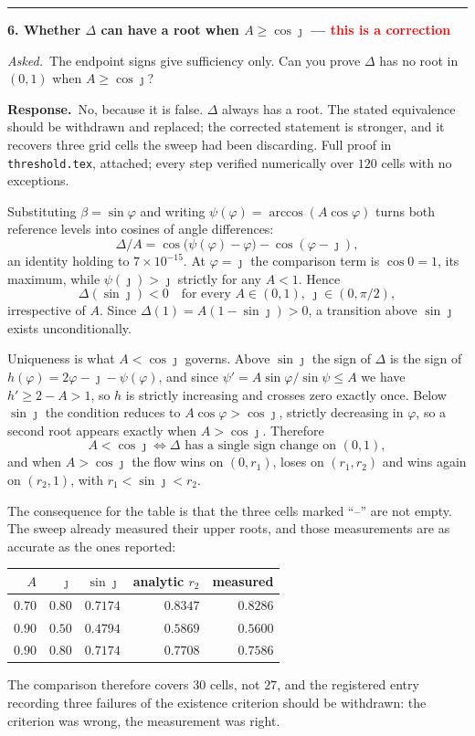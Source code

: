 \documentclass[11pt]{article}
\newenvironment{item12}[1]{%
  \par\medskip\noindent\rule{\textwidth}{0.7pt}\par\nobreak\smallskip
  \noindent\textbf{\large #1}\par\nobreak\smallskip
}{\par\medskip}
\newcommand{\ask}[1]{\noindent\emph{Asked.}\ #1\par\smallskip}
\newcommand{\resp}{\noindent\textbf{Response.}\ }
\begin{document}
\begin{item12}{6. Whether $\Delta$ can have a root when $A\ge\cos\jmath$
\;---\; \textcolor{red}{this is a correction}}
\ask{The endpoint signs give sufficiency only. Can you prove $\Delta$ has no root in $(0,1)$ when
$A\ge\cos\jmath$?}

\resp No, because it is false. $\Delta$ always has a root. The stated equivalence should be
withdrawn and replaced; the corrected statement is stronger, and it recovers three grid cells the
sweep had been discarding. Full proof in \texttt{threshold.tex}, attached; every step verified
numerically over $120$ cells with no exceptions.

Substituting $\beta=\sin\varphi$ and writing $\psi(\varphi)=\arccos(A\cos\varphi)$ turns both
reference levels into cosines of angle differences:
\[
\Delta/A=\cos\!\big(\psi(\varphi)-\varphi\big)-\cos(\varphi-\jmath),
\]
an identity holding to $7\times10^{-15}$. At $\varphi=\jmath$ the comparison term is $\cos 0=1$,
its maximum, while $\psi(\jmath)>\jmath$ strictly for any $A<1$. Hence
\[
\Delta(\sin\jmath)<0\quad\text{for every }A\in(0,1),\ \jmath\in(0,\pi/2),
\]
irrespective of $A$. Since $\Delta(1)=A(1-\sin\jmath)>0$, a transition above $\sin\jmath$ exists
unconditionally.

Uniqueness is what $A<\cos\jmath$ governs. Above $\sin\jmath$ the sign of $\Delta$ is the sign of
$h(\varphi)=2\varphi-\jmath-\psi(\varphi)$, and since $\psi'=A\sin\varphi/\sin\psi\le A$ we have
$h'\ge 2-A>1$, so $h$ is strictly increasing and crosses zero exactly once. Below $\sin\jmath$
the condition reduces to $A\cos\varphi>\cos\jmath$, strictly decreasing in $\varphi$, so a second
root appears exactly when $A>\cos\jmath$. Therefore
\[
A<\cos\jmath\iff\Delta\text{ has a single sign change on }(0,1),
\]
and when $A>\cos\jmath$ the flow wins on $(0,r_1)$, loses on $(r_1,r_2)$ and wins again on
$(r_2,1)$, with $r_1<\sin\jmath<r_2$.

The consequence for the table is that the three cells marked ``--'' are not empty. The sweep
already measured their upper roots, and those measurements are as accurate as the ones reported:

\begin{center}
\small
\begin{tabular}{@{}rrrrr@{}}
\toprule
$A$ & $\jmath$ & $\sin\jmath$ & analytic $r_2$ & measured\\
\midrule
$0.70$ & $0.80$ & $0.7174$ & $0.8347$ & $0.8286$\\
$0.90$ & $0.50$ & $0.4794$ & $0.5869$ & $0.5600$\\
$0.90$ & $0.80$ & $0.7174$ & $0.7708$ & $0.7586$\\
\bottomrule
\end{tabular}
\end{center}

The comparison therefore covers $30$ cells, not $27$, and the registered entry recording three
failures of the existence criterion should be withdrawn: the criterion was wrong, the measurement
was right.
\end{item12}
\end{document}

